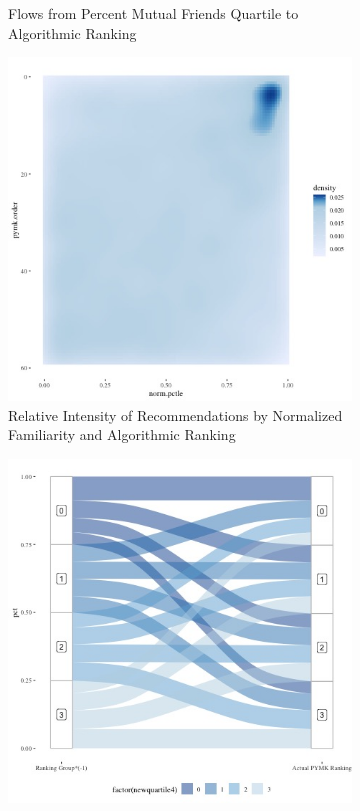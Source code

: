 \documentclass[12pt,letterpaper]{article}
\begin{document}
\begin{figure}[ht]
\begin{subfigure}{.5\textwidth}
        \caption{Flows from Percent Mutual Friends Quartile to Algorithmic Ranking}
        \label{fig:pymkfriend_s}
    \end{subfigure}

   \begin{subfigure}{.5\textwidth} 
        \centering
        \includegraphics[width=1\linewidth]{Output/Graphs/Audit/Heatmaps/US PYMK norm pref rank by pymk rank - smooth.jpg}  
        \caption{Relative Intensity of Recommendations by Normalized Familiarity and Algorithmic Ranking}
        \label{fig:pymkpref_hm}
        \end{subfigure}
    \begin{subfigure}{.5\textwidth}
        \centering
        \includegraphics[width=1\linewidth]{Output/Graphs/Audit/Sankey flows/US PYMK norm quartile to actual.jpg}  

\end{subfigure}
\end{figure}
\end{document}
